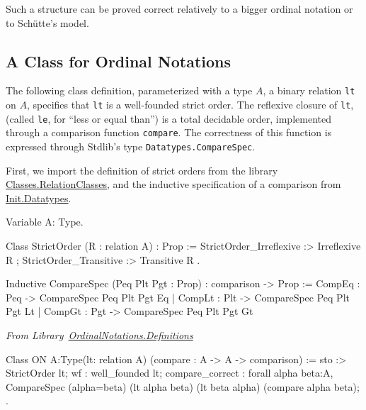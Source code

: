 Such a structure can be proved correct relatively to a bigger ordinal notation or
to Schütte's model.





\subsection{A Class for Ordinal Notations}

The following class definition, parameterized with a type $A$, a binary relation \texttt{lt} on $A$, specifies that \texttt{lt} is a well-founded strict order. The reflexive closure of \texttt{lt}, (called \texttt{le}, for ``less  or equal than'') is a total decidable order, implemented through a comparison function \texttt{compare}.  The correctness of this function is expressed through Stdlib's type 
\texttt{Datatypes.CompareSpec}.

First, we import the definition of strict orders from
the library ~\href{https://coq.inria.fr/distrib/current/stdlib/Coq.Classes.RelationClasses.html}{%
Classes.RelationClasses}, 
and the inductive specification of a comparison from
\href{https://coq.inria.fr/distrib/current/stdlib/Coq.Init.Datatypes.html}{%
Init.Datatypes}.

\begin{Coqsrc}
Variable A: Type.

  Class StrictOrder (R : relation A) : Prop := {
    StrictOrder_Irreflexive :> Irreflexive R ;
    StrictOrder_Transitive :> Transitive R }.
\end{Coqsrc}


\begin{Coqsrc}
Inductive CompareSpec (Peq Plt Pgt : Prop) : comparison -> Prop :=
    CompEq : Peq -> CompareSpec Peq Plt Pgt Eq
  | CompLt : Plt -> CompareSpec Peq Plt Pgt Lt
  | CompGt : Pgt -> CompareSpec Peq Plt Pgt Gt
\end{Coqsrc}

\vspace{4pt}
\noindent\emph{From Library~\href{../theories/html/hydras.OrdinalNotations.Definitions.html}{OrdinalNotations.Definitions}}

\label{types:ON}

\begin{Coqsrc}
Class ON {A:Type}(lt: relation A)
      (compare : A -> A -> comparison)  :=
  {
  sto :> StrictOrder lt;
  wf : well_founded lt;
  compare_correct :
    forall alpha beta:A,
      CompareSpec (alpha=beta) (lt alpha beta) (lt beta alpha)
                  (compare alpha beta);
  }.
\end{Coqsrc}

